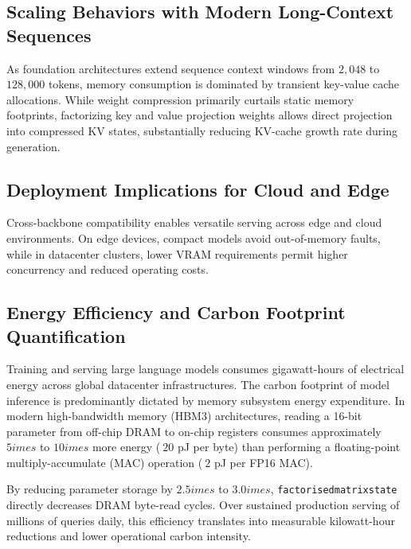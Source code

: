 \subsection{Scaling Behaviors with Modern Long-Context Sequences}
As foundation architectures extend sequence context windows from $2{,}048$ to $128{,}000$ tokens, memory consumption is dominated by transient key-value cache allocations. While weight compression primarily curtails static memory footprints, factorizing key and value projection weights allows direct projection into compressed KV states, substantially reducing KV-cache growth rate during generation.

\subsection{Deployment Implications for Cloud and Edge}
Cross-backbone compatibility enables versatile serving across edge and cloud environments. On edge devices, compact models avoid out-of-memory faults, while in datacenter clusters, lower VRAM requirements permit higher concurrency and reduced operating costs.

\subsection{Energy Efficiency and Carbon Footprint Quantification}
Training and serving large language models consumes gigawatt-hours of electrical energy across global datacenter infrastructures. The carbon footprint of model inference is predominantly dictated by memory subsystem energy expenditure. In modern high-bandwidth memory (HBM3) architectures, reading a 16-bit parameter from off-chip DRAM to on-chip registers consumes approximately $5	imes$ to $10	imes$ more energy ($~20$ pJ per byte) than performing a floating-point multiply-accumulate (MAC) operation ($~2$ pJ per FP16 MAC).

By reducing parameter storage by $2.5	imes$ to $3.0	imes$, \texttt{factorisedmatrixstate} directly decreases DRAM byte-read cycles. Over sustained production serving of millions of queries daily, this efficiency translates into measurable kilowatt-hour reductions and lower operational carbon intensity.
